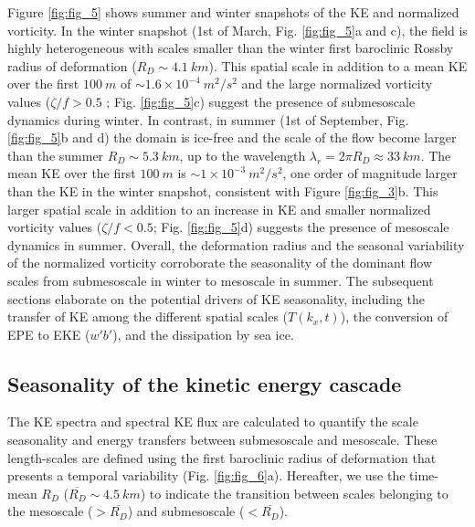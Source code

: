 \documentclass[draft]{agujournal2019}
\begin{document}
Figure \ref{fig:fig_5} shows summer and winter snapshots of the KE and normalized vorticity. In the winter snapshot (1st of March, Fig. \ref{fig:fig_5}a and c), the field is highly heterogeneous with scales smaller than the winter first baroclinic Rossby radius of deformation ($R_{D} \sim 4.1\ km$). This spatial scale in addition to a mean KE over the first $100\ m$ of $\sim 1.6\times10^{-4}\ m^2/s^{2}$ and the large normalized vorticity values ($\zeta/f > 0.5$ ; Fig. \ref{fig:fig_5}c) suggest the presence of submesoscale dynamics during winter. In contrast, in summer (1st of September, Fig. \ref{fig:fig_5}b and d) the domain is ice-free and the scale of the flow become larger than the summer $R_D\sim 5.3\ km$, up to the wavelength $\lambda_r = 2\pi R_D \approx 33\ km$. The mean KE over the first $100\ m$ is $\sim 1\times10^{-3}\ m^2/s^{2}$, one order of magnitude larger than the KE in the winter snapshot, consistent with Figure \ref{fig:fig_3}b. This larger spatial scale in addition to an increase in KE and smaller normalized vorticity values ($\zeta/f < 0.5$; Fig. \ref{fig:fig_5}d) suggests the presence of mesoscale dynamics in summer. Overall, the deformation radius and the seasonal variability of the normalized vorticity corroborate the seasonality of the dominant flow scales from submesoscale in winter to mesoscale in summer. The subsequent sections elaborate on the potential drivers of KE seasonality, including the transfer of KE among the different spatial scales ($T(k_x,t)$), the conversion of EPE to EKE ($w'b'$), and the dissipation by sea ice. %

\subsection{Seasonality of the kinetic energy cascade}
\label{sec3.2}  

The KE spectra and spectral KE flux are calculated to quantify the scale seasonality and energy transfers between submesoscale and mesoscale. These length-scales are defined using the first baroclinic radius of deformation that presents a temporal variability (Fig. \ref{fig:fig_6}a). Hereafter, we use the time-mean $R_D$ ($\overline{R_D} \sim 4.5\ km$) to indicate the transition between scales belonging to the mesoscale ($>\overline{R_D}$) and submesoscale ($<\overline{R_D}$). 
\end{document}
